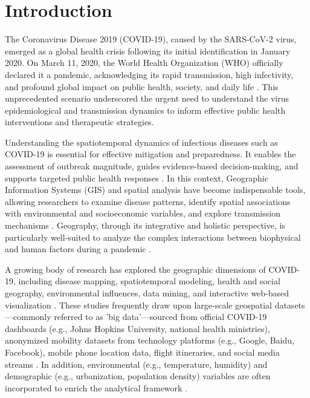 \documentclass[a4paper,fleqn]{cas-sc}
\begin{document}
\section{Introduction}

The Coronavirus Disease 2019 (COVID-19), caused by the SARS-CoV-2 virus, emerged as a global health crisis following its initial identification in January 2020. On March 11, 2020, the World Health Organization (WHO) officially declared it a pandemic, acknowledging its rapid transmission, high infectivity, and profound global impact on public health, society, and daily life \citep{Franch-Pardo2020,Turbe2020,Cuomo2021}. This unprecedented scenario underscored the urgent need to understand the virus epidemiological and transmission dynamics to inform effective public health interventions and therapeutic strategies.

Understanding the spatiotemporal dynamics of infectious diseases such as COVID-19 is essential for effective mitigation and preparedness. It enables the assessment of outbreak magnitude, guides evidence-based decision-making, and supports targeted public health responses \citep{Franch-Pardo2020}. In this context, Geographic Information Systems (GIS) and spatial analysis have become indispensable tools, allowing researchers to examine disease patterns, identify spatial associations with environmental and socioeconomic variables, and explore transmission mechanisms \citep{Franch-Pardo2020}. Geography, through its integrative and holistic perspective, is particularly well-suited to analyze the complex interactions between biophysical and human factors during a pandemic \citep{Franch-Pardo2020}.

A growing body of research has explored the geographic dimensions of COVID-19, including disease mapping, spatiotemporal modeling, health and social geography, environmental influences, data mining, and interactive web-based visualization \citep{Lin2024}. These studies frequently draw upon large-scale geospatial datasets—commonly referred to as 'big data'—sourced from official COVID-19 dashboards (e.g., Johns Hopkins University, national health ministries), anonymized mobility datasets from technology platforms (e.g., Google, Baidu, Facebook), mobile phone location data, flight itineraries, and social media streams \citep{Franch-Pardo2020,Lin2024}. In addition, environmental (e.g., temperature, humidity) and demographic (e.g., urbanization, population density) variables are often incorporated to enrich the analytical framework \citep{Chen2021,Yu2021,Franch-Pardo2020,Ramrez-Aldana2021,Han2021,Dutta2021,Bherwani2021,Parvin2021,Wheeler2022}.
\end{document}
